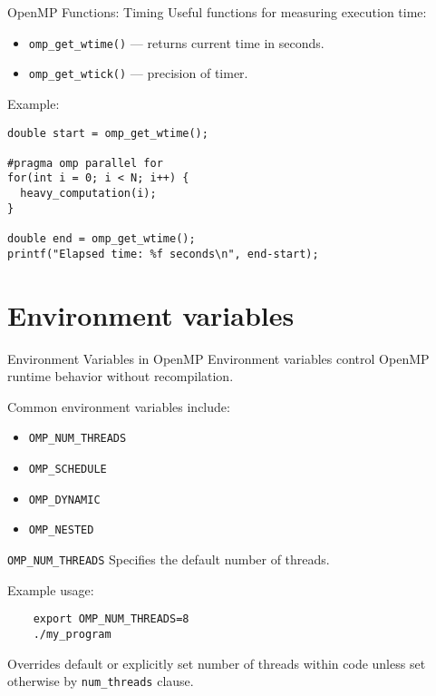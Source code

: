 \documentclass{beamer}
\begin{document}
\begin{frame}[fragile]{OpenMP Functions: Timing}
  Useful functions for measuring execution time:

  \begin{itemize}
    \item \texttt{omp\_get\_wtime()} — returns current time in seconds.
    \item \texttt{omp\_get\_wtick()} — precision of timer.
  \end{itemize}

  Example:
  \lstset{style=CStyle}
  \begin{lstlisting}
double start = omp_get_wtime();

#pragma omp parallel for
for(int i = 0; i < N; i++) {
  heavy_computation(i);
}

double end = omp_get_wtime();
printf("Elapsed time: %f seconds\n", end-start);
  \end{lstlisting}
\end{frame}

\section{Environment variables}

\begin{frame}{Environment Variables in OpenMP}
Environment variables control OpenMP runtime behavior without recompilation.

Common environment variables include:
  \begin{itemize}
    \item \texttt{OMP\_NUM\_THREADS}
    \item \texttt{OMP\_SCHEDULE}
    \item \texttt{OMP\_DYNAMIC}
    \item \texttt{OMP\_NESTED}
  \end{itemize}
\end{frame}

\begin{frame}[fragile]{\texttt{OMP\_NUM\_THREADS}}
  Specifies the default number of threads.

  Example usage:
  \begin{verbatim}
    export OMP_NUM_THREADS=8
    ./my_program
  \end{verbatim}

  Overrides default or explicitly set number of threads within code unless set otherwise by \texttt{num\_threads} clause.
\end{frame}
\end{document}
